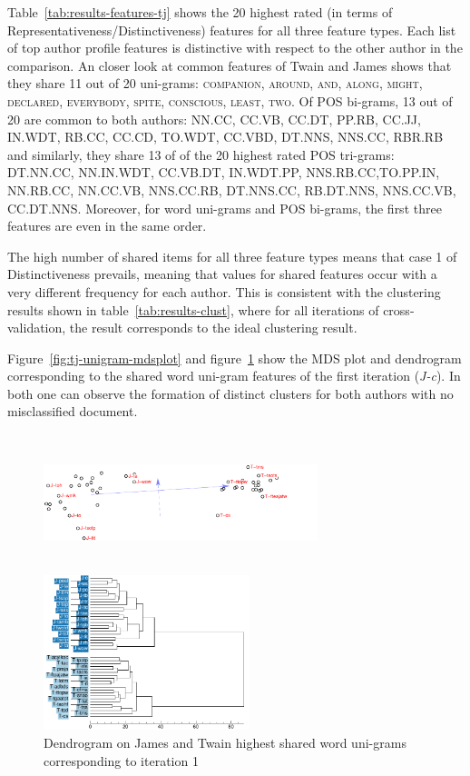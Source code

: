 \documentclass[a4paper,10pt,twoside,fleqn]{article}
\begin{document}
Table~\ref{tab:results-features-tj} shows the  20 highest rated 
(in terms of Representativeness/Distinctiveness) 
features for all three feature types. Each list of top 
author profile features is distinctive with respect to the
other author in the comparison. 
An closer look at common features of Twain and James shows that
they share 11 out of 20 uni-grams: 
\textsc{companion, around, and, along, might, declared,  
 everybody, spite, conscious, least, two}. 
Of POS bi-grams, 13 out of 20 are common to both authors:
NN.CC,  CC.VB,  CC.DT, PP.RB, CC.JJ, IN.WDT, RB.CC, CC.CD,
  TO.WDT, CC.VBD, DT.NNS, NNS.CC, RBR.RB and 
 similarly, they share 13 of of the 20 highest rated POS
 tri-grams:  DT.NN.CC, NN.IN.WDT, CC.VB.DT, IN.WDT.PP, NNS.RB.CC,TO.PP.IN,
 NN.RB.CC, NN.CC.VB, NNS.CC.RB, DT.NNS.CC, RB.DT.NNS, NNS.CC.VB,
 CC.DT.NNS. 
 Moreover, for word uni-grams and POS bi-grams, the first three features 
 are even in the same order. 
 
 The high number of shared items for all three feature types means
 that case 1 of Distinctiveness prevails, meaning that values for shared
 features occur with a very different frequency for each author.
 This is consistent with the clustering results shown in table~\ref{tab:results-clust},
 where for all iterations of cross-validation, the result corresponds to
 the ideal clustering result. 
 
 
Figure~\ref{fig:tj-unigram-mdsplot} and figure~\ref{fig:tj-unigram-dendo}
show the MDS plot and dendrogram corresponding to the shared word uni-gram 
features of the first iteration (\emph{J-c}). 
In both one can observe the formation of distinct clusters for both authors 
with no misclassified document. 
 
\begin{figure}[h!]
\centering
\parbox{8cm}{
\includegraphics[width=8cm,height=4cm]{mdsplot/tj-wuni-J-c.pdf}
\caption{MDS plot on James and Twain highest shared word uni-grams 
corresponding to iteration 1.}
\label{fig:tj-unigram-mdsplot}}
\qquad
\begin{minipage}{6cm}
\includegraphics[width=6cm]{dend/tj-wuni-cl-Jc.pdf}
\caption{Dendrogram on James and Twain highest shared word uni-grams 
corresponding to iteration 1}
\label{fig:tj-unigram-dendo}
\end{minipage}
\end{figure}
\end{document}
